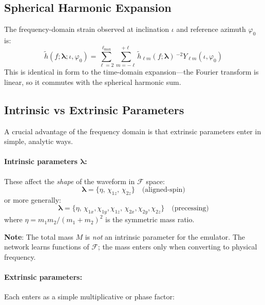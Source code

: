 \documentclass[11pt,a4paper]{article}
\newcommand{\htlm}{\tilde{h}_{\ell m}}
\newcommand{\Ylm}{{}^{-2}Y_{\ell m}}
\newcommand{\veclambda}{\bm{\lambda}}
\newcommand{\Mf}{\mathcal{F}}
\begin{document}
\subsection{Spherical Harmonic Expansion}

The frequency-domain strain observed at inclination $\iota$ and reference azimuth $\varphi_0$ is:
\begin{equation}
    \boxed{
    \tilde{h}(f; \veclambda; \iota, \varphi_0) = \sum_{\ell=2}^{\ell_{\max}} \sum_{m=-\ell}^{+\ell} \htlm(f; \veclambda) \, \Ylm(\iota, \varphi_0)
    }
    \label{eq:spherical_harmonic}
\end{equation}
This is identical in form to the time-domain expansion---the Fourier transform is linear, so it commutes with the spherical harmonic sum.

\subsection{Intrinsic vs Extrinsic Parameters}
\label{sec:intrinsic_extrinsic}

A crucial advantage of the frequency domain is that extrinsic parameters enter in simple, analytic ways.

\paragraph{Intrinsic parameters $\veclambda$:} These affect the \emph{shape} of the waveform in $\Mf$ space:
\begin{equation}
    \veclambda = \{\eta, \, \chi_{1z}, \, \chi_{2z}\} \quad \text{(aligned-spin)}
    \label{eq:intrinsic_aligned}
\end{equation}
or more generally:
\begin{equation}
    \veclambda = \{\eta, \, \chi_{1x}, \chi_{1y}, \chi_{1z}, \, \chi_{2x}, \chi_{2y}, \chi_{2z}\} \quad \text{(precessing)}
    \label{eq:intrinsic_precessing}
\end{equation}
where $\eta = m_1 m_2 / (m_1 + m_2)^2$ is the symmetric mass ratio.

\textbf{Note}: The total mass $M$ is \emph{not} an intrinsic parameter for the emulator. The network learns functions of $\Mf$; the mass enters only when converting to physical frequency.

\paragraph{Extrinsic parameters:} Each enters as a simple multiplicative or phase factor:
\end{document}
